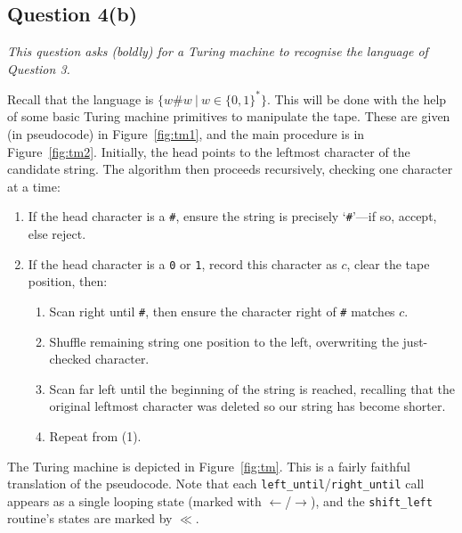 \documentclass[a4paper]{article}
\begin{document}
\subsection*{Question 4(b)}
\begin{center}
  \textit{
    This question asks  (boldly) for a Turing machine to recognise the language of Question 3.
  }
\end{center}
Recall that the language is
$\{w\#w~|~w \in \{0,1\}^*\}$.
This will be done with the help of some basic Turing machine primitives to manipulate the tape. These are given (in pseudocode)
in Figure~\ref{fig:tm1}, and the main procedure is in Figure~\ref{fig:tm2}.
Initially, the head points to the leftmost character of the candidate string.
The algorithm then proceeds recursively, checking one character at a time:
\begin{enumerate}[label=(\arabic*),noitemsep]
  \item If the head character is a \texttt{\#}, ensure the string is precisely `\texttt{\#}'---if so, accept, else reject.
  \item If the head character is a \texttt{0} or \texttt 1, record this character as $c$, clear the tape position, then:
    \begin{enumerate}[noitemsep]
      \item Scan right until \texttt{\#}, then ensure the character right of \texttt{\#} matches $c$.
      \item Shuffle remaining string one position to the left,
        overwriting the just-checked character.
      \item Scan far left until the beginning of the string is reached,
        recalling that the original leftmost character was deleted
        so our string has become shorter.
      \item Repeat from (1).
    \end{enumerate}
\end{enumerate}
The Turing machine is depicted in Figure~\ref{fig:tm}.
This is a fairly faithful translation of the pseudocode.
Note that each \texttt{left\_until}/\texttt{right\_until} call appears as a single looping state (marked with $\leftarrow$/$\rightarrow$),
and the \texttt{shift\_left} routine's states are marked by $\ll$.
\end{document}
